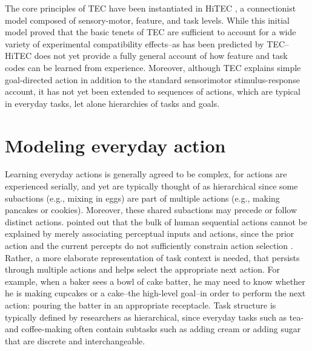 \documentclass[10pt,letterpaper]{article}
\numberwithin{equation}{section}
\begin{document}

The core principles of TEC have been instantiated in HiTEC \cite{Haazebroek:2011}, a connectionist model composed of sensory-motor, feature, and task levels. While this initial model proved that the basic tenets of TEC are sufficient to account for a wide variety of experimental compatibility effects--as has been predicted by TEC--HiTEC does not yet provide a fully general account of how feature and task codes can be learned from experience. Moreover, although TEC explains simple goal-directed action in addition to the standard sensorimotor stimulus-response account, it has not yet been extended to sequences of actions, which are typical in everyday tasks, let alone hierarchies of tasks and goals.


\section*{Modeling everyday action}

Learning everyday actions is generally agreed to be complex, for actions are experienced serially, and yet are typically thought of as hierarchical since some subactions (e.g., mixing in eggs) are part of multiple actions (e.g., making pancakes or cookies). Moreover, these shared subactions may precede or follow distinct actions.  pointed out that the bulk of human sequential actions cannot be explained by merely associating perceptual inputs and actions, since the prior action and the current percepts do not sufficiently constrain action selection \cite<for a review, see>{Rosenbaum:2007}. Rather, a more elaborate representation of task context is needed, that persists through multiple actions and helps select the appropriate next action. For example, when a baker sees a bowl of cake batter, he may need to know whether he is making cupcakes or a cake--the high-level goal--in order to perform the next action: pouring the batter in an appropriate receptacle. Task structure is typically defined by researchers as hierarchical, since everyday tasks such as tea- and coffee-making often contain subtasks such as adding cream or adding sugar that are discrete and interchangeable.
\end{document}
